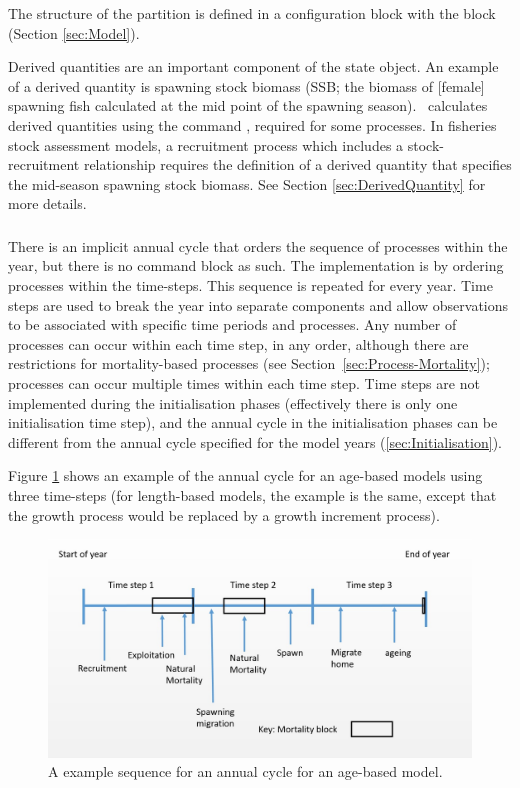 The structure of the partition is defined in a configuration block with the  block (Section \ref{sec:Model}).

Derived quantities are an important component of the state object. An example of a derived quantity is spawning stock biomass (SSB; the biomass of [female] spawning fish calculated at the mid point of the spawning season). \CNAME\ calculates derived quantities using the command , required for some processes. In fisheries stock assessment models, a recruitment process which includes a stock-recruitment relationship requires the definition of a derived quantity that specifies the mid-season spawning stock biomass. See Section \ref{sec:DerivedQuantity} for more details.

\subsubsection{}\label{sec:TimeStep}

There is an implicit annual cycle that orders the sequence of processes within the year, but there is no command block as such. The implementation is by ordering processes within the time-steps. This sequence is repeated for every year. Time steps are used to break the year into separate components and allow observations to be associated with specific time periods and processes. Any number of processes can occur within each time step, in any order, although there are restrictions for mortality-based processes (see Section~\ref{sec:Process-Mortality}); processes can occur multiple times within each time step. Time steps are not implemented during the initialisation phases (effectively there is only one initialisation time step), and the annual cycle in the initialisation phases can be different from the annual cycle specified for the model years (\ref{sec:Initialisation}).

Figure \ref{Fig:annual} shows an example of the annual cycle for an age-based models using three time-steps (for length-based models, the example is the same, except that the growth process would be replaced by a growth increment process).

\begin{figure}
	\centering
	\includegraphics[scale=0.5]{Figures/annual_cycle.jpg}
	\caption{A example sequence for an annual cycle for an age-based model.}\label{Fig:annual}
\end{figure}

